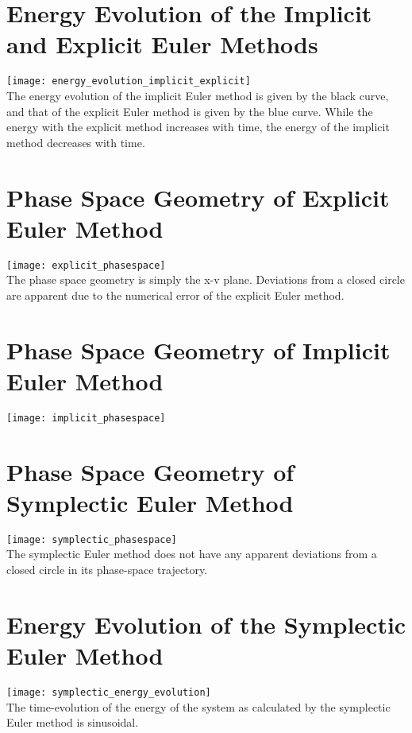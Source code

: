 \documentclass[11pt]{article} %
\begin{document}
\section{Energy Evolution of the Implicit and Explicit Euler Methods}
\texttt{[image: energy\_evolution\_implicit\_explicit]}
\\
The energy evolution of the implicit Euler method is given by the black curve, and that of the explicit Euler method is given by the blue curve. While the energy with the explicit method increases with time, the energy of the implicit method decreases with time. 

\section{Phase Space Geometry of Explicit Euler Method}
\texttt{[image: explicit\_phasespace]}
\\
The phase space geometry is simply the x-v plane. Deviations from a closed circle are apparent due to the numerical error of the explicit Euler method. 

\section{Phase Space Geometry of Implicit Euler Method}
\texttt{[image: implicit\_phasespace]}

\section{Phase Space Geometry of Symplectic Euler Method}
\texttt{[image: symplectic\_phasespace]}
\\
The symplectic Euler method does not have any apparent deviations from a closed circle in its phase-space trajectory.

\section{Energy Evolution of the Symplectic Euler Method}
\texttt{[image: symplectic\_energy\_evolution]}
\\
The time-evolution of the energy of the system as calculated by the symplectic Euler method is sinusoidal.
\end{document}
